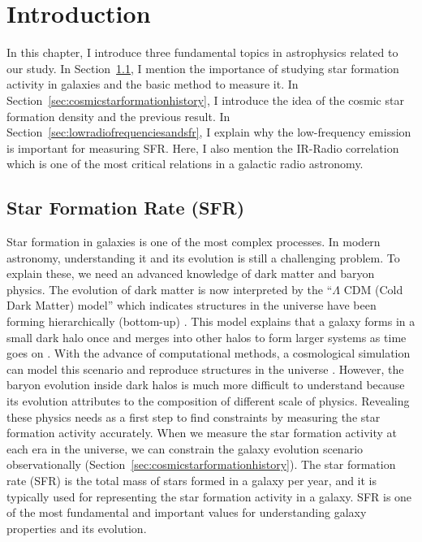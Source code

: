 \chapter{Introduction}\label{chap:introduction}
\begin{chapabstract}

In this chapter, I introduce three fundamental topics in astrophysics related to our study.
In Section~\ref{sec:starformationrate}, I mention the importance of studying star formation activity in galaxies and the basic method to measure it.
In Section~\ref{sec:cosmicstarformationhistory}, I introduce the idea of the cosmic star formation density and the previous result.
In Section~\ref{sec:lowradiofrequenciesandsfr}, I explain why the low-frequency emission is important for measuring SFR\@.
Here, I also mention the IR-Radio correlation which is one of the most critical relations in a galactic radio astronomy.


\end{chapabstract}

\section{Star Formation Rate (SFR)}\label{sec:starformationrate}

Star formation in galaxies is one of the most complex processes.
In modern astronomy, understanding it and its evolution is still a challenging problem.
To explain these, we need an advanced knowledge of dark matter and baryon physics.
The evolution of dark matter is now interpreted by the ``$\Lambda$ CDM (Cold Dark Matter) model'' which indicates structures in the universe have been forming hierarchically (bottom-up) \citep[e.g.,][]{Peebles1982}.
This model explains that a galaxy forms in a small dark halo once and merges into other halos to form larger systems as time goes on \citep{Blumenthal1984}.
With the advance of computational methods, a cosmological simulation can model this scenario and reproduce structures in the universe \citep[e.g.,][]{Navarro2000, Vale2004}.
However, the baryon evolution inside dark halos is much more difficult to understand because its evolution attributes to the composition of different scale of physics.
Revealing these physics needs as a first step to find constraints by measuring the star formation activity accurately.
When we measure the star formation activity at each era in the universe, we can constrain the galaxy evolution scenario observationally (Section~\ref{sec:cosmicstarformationhistory}).
The star formation rate (SFR) is the total mass of stars formed in a galaxy per year, and it is typically used for representing the star formation activity in a galaxy.
SFR is one of the most fundamental and important values for understanding galaxy properties and its evolution.

